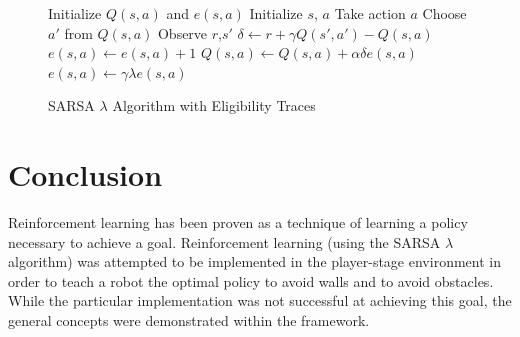 \documentclass[conference]{IEEEtran}
\begin{document}
\begin{figure}
\begin{algorithmic}
\State Initialize $Q(s,a)$ and $e(s,a)$
    \State Initialize $s$, $a$
        \State Take action $a$
        \State Choose $a'$ from $Q(s,a)$
        \State Observe $r$,$s'$
        \State $\delta \gets r + \gamma Q(s',a') - Q(s,a) $
        \State $e(s,a) \gets e(s,a) +1$
            \State $Q(s,a) \gets Q(s,a) + \alpha \delta e(s,a)$
            \State $e(s,a) \gets \gamma \lambda e(s,a)$
        \EndFor
    \EndWhile
\EndWhile
\end{algorithmic}
\caption{SARSA $\lambda$ Algorithm with Eligibility Traces}
\label{SARSALambdaElig}
\end{figure}

\section{Conclusion}
Reinforcement learning has been proven as a technique of learning a policy necessary to achieve a goal. 
Reinforcement learning (using the SARSA $\lambda$ algorithm) was attempted to be implemented in the player-stage environment in order to teach a robot the optimal policy to avoid walls and to avoid obstacles.
While the particular implementation was not successful at achieving this goal, the general concepts were demonstrated within the framework.
\end{document}
